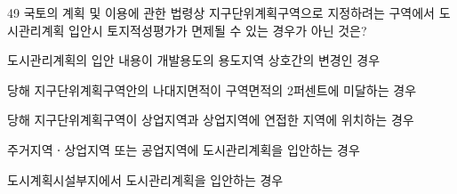 \begin{question}{49}
국토의 계획 및 이용에 관한 법령상 지구단위계획구역으로 지정하려는 구역에서 도시관리계획 입안시 토지적성평가가 면제될 수 있는 경우가 아닌 것은?
\begin{choices}
  \item 도시관리계획의 입안 내용이 개발용도의 용도지역 상호간의 변경인 경우
  \item 당해 지구단위계획구역안의 나대지면적이 구역면적의 2퍼센트에 미달하는 경우
  \item 당해 지구단위계획구역이 상업지역과 상업지역에 연접한 지역에 위치하는 경우
  \item 주거지역ㆍ상업지역 또는 공업지역에 도시관리계획을 입안하는 경우
  \item 도시계획시설부지에서 도시관리계획을 입안하는 경우
\end{choices}
\end{question}
